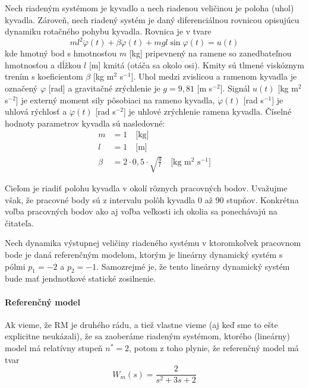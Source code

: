 \documentclass[a4paper, 10pt, ]{article}
\begin{document}
Nech riadeným systémom je kyvadlo a nech riadenou veličinou je poloha (uhol) kyvadla. Zároveň, nech riadený systém je daný diferenciálnou rovnicou opisujúcu dynamiku rotačného pohybu kyvadla. Rovnica je v tvare
\begin{equation} \label{analOpRS}
    ml^2 \ddot{\varphi}(t) + \beta \dot{\varphi}(t) + mgl\sin{\varphi(t)} = u(t)
\end{equation}
kde hmotný bod s hmotnosťou $m$ [kg] pripevnený na ramene so zanedbateľnou hmotnosťou a dĺžkou $l$ [m] kmitá (otáča sa okolo osi). Kmity sú tlmené viskóznym trením s koeficientom $\beta$ [kg m$^2$ s$^{-1}$]. Uhol medzi zvislicou a ramenom kyvadla je označený $\varphi$ [rad] a gravitačné zrýchlenie je $g = 9,81$ [m s$^{-2}$]. Signál $u(t)$ [kg m$^2$ s$^{-2}$] je externý moment sily pôsobiaci na rameno kyvadla, $\dot{\varphi}(t)$ [rad s$^{-1}$] je uhlová rýchlosť a $\ddot{\varphi}(t)$ [rad s$^{-2}$] je uhlové zrýchlenie ramena kyvadla.
Číselné hodnoty parametrov kyvadla sú nasledovné:
\begin{align*}
	m &= 1 \quad \text{[kg]}\\
	l &= 1 \quad \text{[m]}\\
	\beta &= 2 \cdot 0,5 \cdot \sqrt{\frac{g}{l}} \quad \text{[kg m$^2$ s$^{-1}$]}
\end{align*}

Cieľom je riadiť polohu kyvadla v okolí rôznych pracovných bodov. Uvažujme však, že pracovné body sú z intervalu polôh kyvadla 0 až 90 stupňov. Konkrétna voľba pracovných bodov ako aj voľba veľkosti ich okolia sa ponechávajú na čitateľa.



Nech dynamika výstupnej veličiny riadeného systému v ktoromkoľvek pracovnom bode je daná referenčným modelom, ktorým je lineárny dynamický systém s pólmi $p_1 = -2$ a $p_2 = -1$. Samozrejmé je, že tento lineárny dynamický systém bude mať jendnotkové statické zosilnenie.

\paragraph{Referenčný model}

Ak vieme, že RM je druhého rádu, a tiež vlastne vieme (aj keď sme to ešte explicitne neukázali), že sa zaoberáme riadeným systémom, ktorého (lineárny) model má relatívny stupeň $n^* = 2$, potom z toho plynie, že referenčný model má tvar
\begin{equation}
    W_m(s) = \frac{2}{ s^2 + 3 s + 2}
\end{equation}
\end{document}

